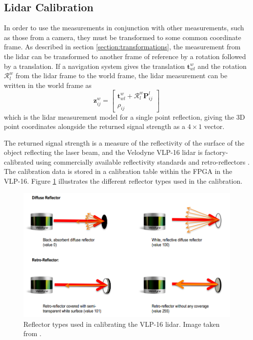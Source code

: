 \subsection{Lidar Calibration}
In order to use the measurements in conjunction with other measurements, such as those from a camera, they must be transformed to some common coordinate frame. As described in section \ref{section:transformations}, the measurement from the lidar can be transformed to another frame of reference by a rotation followed by a translation. If a navigation system gives the translation $\mathbf{t}^{w}_{wl}$ and the rotation $\mathcal{R}^{w}_{l}$ from the lidar frame to the world frame, the lidar measurement can be written in the world frame as
\begin{equation}
\mathbf{z}^w_{ij} = \begin{bmatrix}
\mathbf{t}^w_{wl}+\mathcal{R}^{w}_{l}\mathbf{P}^{l}_{ij}\\
\rho_{ij}
\end{bmatrix}
\end{equation}
which is the lidar measurement model for a single point reflection, giving the 3D point coordinates alongside the returned signal strength as a $4\times 1$ vector.

The returned signal strength is a measure of the reflectivity of the surface of the object reflecting the laser beam, and the Velodyne VLP-16 lidar is factory-calibrated using commercially available reflectivity standards and retro-reflectors \cite{velodyne_vlp16}. The calibration data is stored in a calibration table within the FPGA in the VLP-16. Figure \ref{fig:lidar_reflectortypes} illustrates the different reflector types used in the calibration.
\begin{figure}
	\centering
	\includegraphics[width=.7\linewidth]{fig/vlp16_calibration.png}
	\caption{Reflector types used in calibrating the VLP-16 lidar. Image taken from \cite{velodyne_vlp16}.}
	\label{fig:lidar_reflectortypes}
\end{figure}
